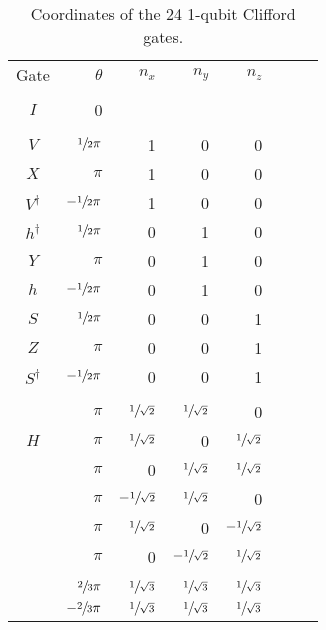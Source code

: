 \documentclass[article,pagebackref]{bespoke5}
\begin{document}




\begin{table}[htp]
\caption{Coordinates of the 24 1-qubit Clifford gates.}
\begin{center}
\begin{tabular}{crrrrcc}
Gate & $\theta$ & $n_x$ & $n_y$ & $n_z$  \\
\\
$I$ & 0 &&&												& $\quad$ & \\
\\
$V$ 					& $\sfrac{1}{2}\pi$ 	& 1 & 0 & 0  & %
\\
$X$ 					& $\pi$ 				& 1 & 0 & 0 & %
\\
$ V^\dagger$   			& $-\sfrac{1}{2}\pi$ 	& 1 & 0 & 0 &%
\\
$h^\dagger$            	& $\sfrac{1}{2}\pi$ 	& 0 & 1 & 0 &%
\\
$Y$ 			      	& $\pi$ 		 		& 0 & 1 & 0 &%
\\
$h$    					& $-\sfrac{1}{2}\pi$  	& 0 & 1 & 0 &%
\\
$S$ 					& $\sfrac{1}{2}\pi$  	& 0 & 0 & 1 &%
\\
$Z$ 					& $\pi$ 				& 0 & 0 & 1 &%
\\
$S^\dagger$ 			& $-\sfrac{1}{2}\pi$ 	& 0 & 0 & 1 &%
\\
\\
						& $\pi$ 				& $\sfrac{1}{\sqrt{2}}$ & $\sfrac{1}{\sqrt{2}}$ & 0 	&%
\\
$H$						& $\pi$ 				& $\sfrac{1}{\sqrt{2}}$ &0 & $\sfrac{1}{\sqrt{2}}$ 		&%
\\
						& $\pi$ 				& 0 & $\sfrac{1}{\sqrt{2}}$ & $\sfrac{1}{\sqrt{2}}$ 	&%
\\
						& $\pi$ 				& $-\sfrac{1}{\sqrt{2}}$ & $\sfrac{1}{\sqrt{2}}$ & 0 	&%
\\
						& $\pi$ 				& $\sfrac{1}{\sqrt{2}}$ &0 & $-\sfrac{1}{\sqrt{2}}$ 	&%
\\
						& $\pi$ 				& 0 & $-\sfrac{1}{\sqrt{2}}$ & $\sfrac{1}{\sqrt{2}}$ 	&%
\\
\\
						& $\sfrac{2}{3}\pi$ 	& $\sfrac{1}{\sqrt{3}}$ & $\sfrac{1}{\sqrt{3}}$ & $\sfrac{1}{\sqrt{3}}$ & \\
						& $-\sfrac{2}{3}\pi$	& $\sfrac{1}{\sqrt{3}}$ & $\sfrac{1}{\sqrt{3}}$ & $\sfrac{1}{\sqrt{3}}$ & \\


\end{tabular}
\end{center}
\end{table}
\end{document}
